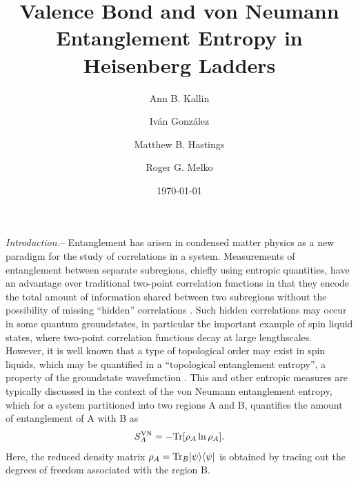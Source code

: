 \documentclass[prl,aps,twocolumn,floatfix,amsmath,amssymb,superscriptaddress,tightenlines]{revtex4}
\begin{document}
\date{\today}
\title{Valence Bond and von Neumann Entanglement Entropy in Heisenberg Ladders}
\author{Ann B. Kallin}

\author{Iv\'an Gonz\'alez}

\author{Matthew B. Hastings}

\author{Roger G. Melko}

\begin{abstract}

\end{abstract}
\maketitle


{\it Introduction.}-- Entanglement has arisen in condensed matter physics as a new paradigm for the study of correlations in a system.  Measurements of entanglement between separate subregions, chiefly using entropic quantities, have an advantage over traditional two-point correlation functions in that they encode the total amount of information shared between two subregions without the possibility of missing ``hidden'' correlations \cite{wolf}.  Such hidden correlations may occur in some quantum groundstates,  in particular the important example of spin liquid states, where two-point correlation functions decay at large lengthscales.  However, it is well known that a type of topological order may exist in spin liquids, which may be quantified in a ``topological entanglement entropy'', a property of the groundstate wavefunction \cite{ KP, LW}.  This and other entropic measures are typically discussed in the context of the von Neumann entanglement entropy, which for a system partitioned into two regions A and B, quantifies the amount of entanglement of A with B as
\begin{equation}
S^{\rm VN}_A = - {\rm Tr} [ \rho_A \ln \rho_A ]. \label{vNEE}
\end{equation}
Here, the reduced density matrix $\rho_A = {\rm Tr}_B | \psi \rangle \langle \psi |$ is obtained by tracing out the degrees of freedom associated with the region B.
\end{document}
